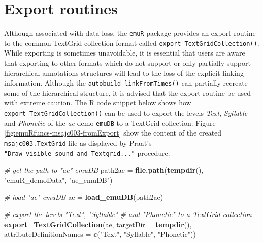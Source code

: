\documentclass[]{book}
\newenvironment{Shaded}{\begin{snugshade}}{\end{snugshade}}
\newcommand{\CommentTok}[1]{\textcolor[rgb]{0.56,0.35,0.01}{\textit{#1}}}
\newcommand{\DataTypeTok}[1]{\textcolor[rgb]{0.13,0.29,0.53}{#1}}
\newcommand{\KeywordTok}[1]{\textcolor[rgb]{0.13,0.29,0.53}{\textbf{#1}}}
\newcommand{\NormalTok}[1]{#1}
\newcommand{\StringTok}[1]{\textcolor[rgb]{0.31,0.60,0.02}{#1}}
\begin{document}
\hypertarget{sec:emuRpackageDetails-exportRoutines}{%
\section{Export routines}\label{sec:emuRpackageDetails-exportRoutines}}

Although associated with data loss, the \texttt{emuR} package provides an export routine to the common TextGrid collection format called \texttt{export\_TextGridCollection()}. While exporting is sometimes unavoidable, it is essential that users are aware that exporting to other formats which do not support or only partially support hierarchical annotations structures will lead to the loss of the explicit linking information. Although the \texttt{autobuild\_linkFromTimes()} can partially recreate some of the hierarchical structure, it is advised that the export routine be used with extreme caution. The R code snippet below shows how \texttt{export\_TextGridCollection()} can be used to export the levels \emph{Text}, \emph{Syllable} and \emph{Phonetic} of the \emph{ae} demo \texttt{emuDB} to a TextGrid collection. Figure \ref{fig:emuRfuncs-msajc003-fromExport} show the content of the created \texttt{msajc003.TextGrid} file as displayed by Praat's \texttt{"Draw\ visible\ sound\ and\ Textgrid..."} procedure.

\begin{Shaded}
\begin{Highlighting}[]
\CommentTok{# get the path to "ae" emuDB}
\NormalTok{path2ae =}\StringTok{ }\KeywordTok{file.path}\NormalTok{(}\KeywordTok{tempdir}\NormalTok{(), }\StringTok{"emuR_demoData"}\NormalTok{, }\StringTok{"ae_emuDB"}\NormalTok{)}

\CommentTok{# load "ae" emuDB}
\NormalTok{ae =}\StringTok{ }\KeywordTok{load_emuDB}\NormalTok{(path2ae)}

\CommentTok{# export the levels "Text", "Syllable"}
\CommentTok{# and "Phonetic" to a TextGrid collection}
\KeywordTok{export_TextGridCollection}\NormalTok{(ae,}
                          \DataTypeTok{targetDir =} \KeywordTok{tempdir}\NormalTok{(),}
                          \DataTypeTok{attributeDefinitionNames =} \KeywordTok{c}\NormalTok{(}\StringTok{"Text"}\NormalTok{,}
                                                       \StringTok{"Syllable"}\NormalTok{,}
                                                       \StringTok{"Phonetic"}\NormalTok{))}
\end{Highlighting}
\end{Shaded}
\end{document}
